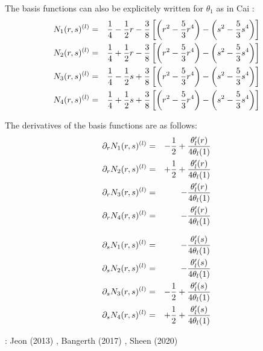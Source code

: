 The basis functions can also be explicitely written for $\theta_1$ as in Cai \etal \cite{cady99}:
\begin{eqnarray}
N_1(r,s)^{(l)} 
&=& \frac{1}{4} - \frac{1}{2} r - \frac38 \left[\left( r^2-\frac53r^4 \right) - \left(s^2-\frac53s^4 \right) \right] \nonumber\\
N_2(r,s)^{(l)} 
&=& \frac{1}{4} + \frac{1}{2} r - \frac38 \left[\left( r^2-\frac53r^4 \right) - \left(s^2-\frac53s^4 \right) \right] \nonumber\\
N_3(r,s)^{(l)} 
&=& \frac{1}{4} - \frac{1}{2} s + \frac38 \left[\left( r^2-\frac53r^4 \right) - \left(s^2-\frac53s^4 \right) \right] \nonumber\\
N_4(r,s)^{(l)} 
&=& \frac{1}{4} + \frac{1}{2} s + \frac38 \left[\left( r^2-\frac53r^4 \right) - \left(s^2-\frac53s^4 \right) \right] 
\end{eqnarray}

The derivatives of the basis functions are as follows:
\begin{eqnarray}
\partial_r N_1(r,s)^{(l)} &=&  - \frac{1}{2}  + \frac{\theta_l'(r)}{4 \theta_l(1)}  \nonumber\\
\partial_r N_2(r,s)^{(l)} &=&  + \frac{1}{2}  + \frac{\theta_l'(r)}{4 \theta_l(1)}  \nonumber\\
\partial_r N_3(r,s)^{(l)} &=&  - \frac{\theta_l'(r)}{4 \theta_l(1)}  \nonumber\\
\partial_r N_4(r,s)^{(l)} &=&  - \frac{\theta_l'(r)}{4 \theta_l(1)}  
\end{eqnarray}

\begin{eqnarray}
\partial_s N_1(r,s)^{(l)} &=&   -\frac{\theta_l'(s)}{4 \theta_l(1)}  \nonumber\\
\partial_s N_2(r,s)^{(l)} &=&   -\frac{\theta_l'(s)}{4 \theta_l(1)}  \nonumber\\
\partial_s N_3(r,s)^{(l)} &=&   - \frac{1}{2} + \frac{\theta_l'(s)}{4 \theta_l(1)}  \nonumber\\
\partial_s N_4(r,s)^{(l)} &=&   + \frac{1}{2} + \frac{\theta_l'(s)}{4 \theta_l(1)}  
\end{eqnarray}





\Literature: 
Jeon \etal (2013) \cite{jens13},
Bangerth \etal (2017) \cite{baks17},
Sheen (2020) \cite{shee20}

